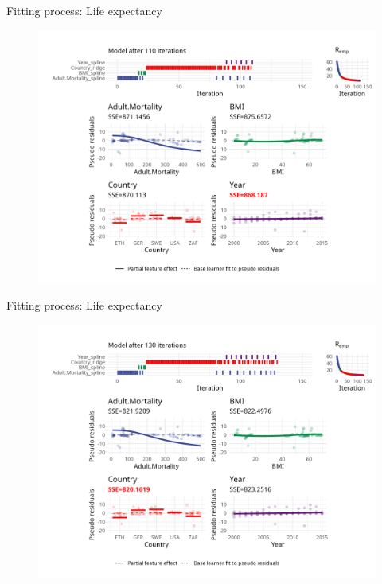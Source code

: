\begin{frame}{Fitting process: Life expectancy}
	\begin{figure}
		\centering
		\includegraphics[width=\textwidth]{figures/cwb-anim/fig-iter-0110.png}
	\end{figure}
	\addtocounter{framenumber}{-1}
\end{frame}


\begin{frame}{Fitting process: Life expectancy}
	\begin{figure}
		\centering
		\includegraphics[width=\textwidth]{figures/cwb-anim/fig-iter-0130.png}
	\end{figure}
	\addtocounter{framenumber}{-1}
\end{frame}


